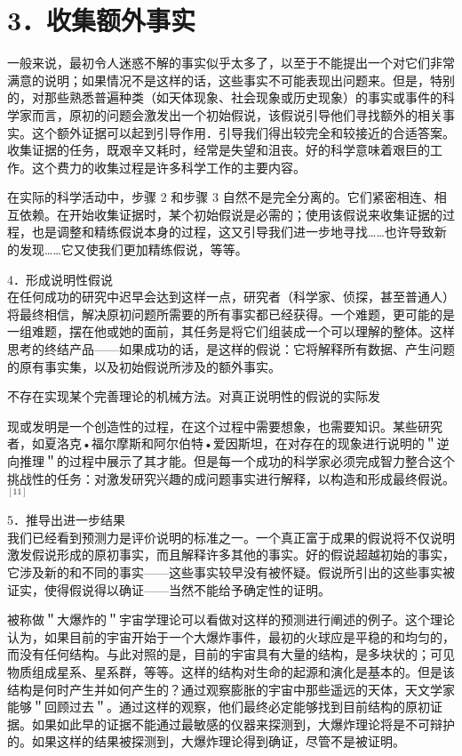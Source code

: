 \section*{3．收集额外事实}
一般来说，最初令人迷惑不解的事实似乎太多了，以至于不能提出一个对它们非常满意的说明；如果情况不是这样的话，这些事实不可能表现出问题来。但是，特别的，对那些熟悉普遍种类（如天体现象、社会现象或历史现象）的事实或事件的科学家而言，原初的问题会激发出一个初始假说，该假说引导他们寻找额外的相关事实。这个额外证据可以起到引导作用．引导我们得出较完全和较接近的合适答案。收集证据的任务，既艰辛又耗时，经常是失望和沮丧。好的科学意味着艰巨的工作。这个费力的收集过程是许多科学工作的主要内容。

在实际的科学活动中，步骤 2 和步骤 3 自然不是完全分离的。它们紧密相连、相互依赖。在开始收集证据时，某个初始假说是必需的；使用该假说来收集证据的过程，也是调整和精练假说本身的过程，这又引导我们进一步地寻找……也许导致新的发现……它又使我们更加精练假说，等等。

4．形成说明性假说\\
在任何成功的研究中迟早会达到这样一点，研究者（科学家、侦探，甚至普通人）将最终相信，解决原初问题所需要的所有事实都已经获得。一个难题，更可能的是一组难题，摆在他或她的面前，其任务是将它们组装成一个可以理解的整体。这样思考的终结产品——如果成功的话，是这样的假说：它将解释所有数据、产生问题的原有事实集，以及初始假说所涉及的额外事实。

不存在实现某个完善理论的机械方法。对真正说明性的假说的实际发

现或发明是一个创造性的过程，在这个过程中需要想象，也需要知识。某些研究者，如夏洛克•福尔摩斯和阿尔伯特•爱因斯坦，在对存在的现象进行说明的＂逆向推理＂的过程中展示了其才能。但是每一个成功的科学家必须完成智力整合这个挑战性的任务：对激发研究兴趣的成问题事实进行解释，以构造和形成最终假说。 ${ }^{[11]}$

5．推导出进一步结果\\
我们已经看到预测力是评价说明的标准之一。一个真正富于成果的假说将不仅说明激发假说形成的原初事实，而且解释许多其他的事实。好的假说超越初始的事实，它涉及新的和不同的事实——这些事实较早没有被怀疑。假说所引出的这些事实被证实，使得假说得以确证——当然不能给予确定性的证明。

被称做＂大爆炸的＂宇宙学理论可以看做对这样的预测进行阐述的例子。这个理论认为，如果目前的宇宙开始于一个大爆炸事件，最初的火球应是平稳的和均匀的，而没有任何结构。与此对照的是，目前的宇宙具有大量的结构，是多块状的；可见物质组成星系、星系群，等等。这样的结构对生命的起源和演化是基本的。但是该结构是何时产生并如何产生的？通过观察膨胀的宇宙中那些遥远的天体，天文学家能够＂回顾过去＂。通过这样的观察，他们最终必定能够找到目前结构的原初证据。如果如此早的证据不能通过最敏感的仪器来探测到，大爆炸理论将是不可辩护的。如果这样的结果被探测到，大爆炸理论得到确证，尽管不是被证明。


